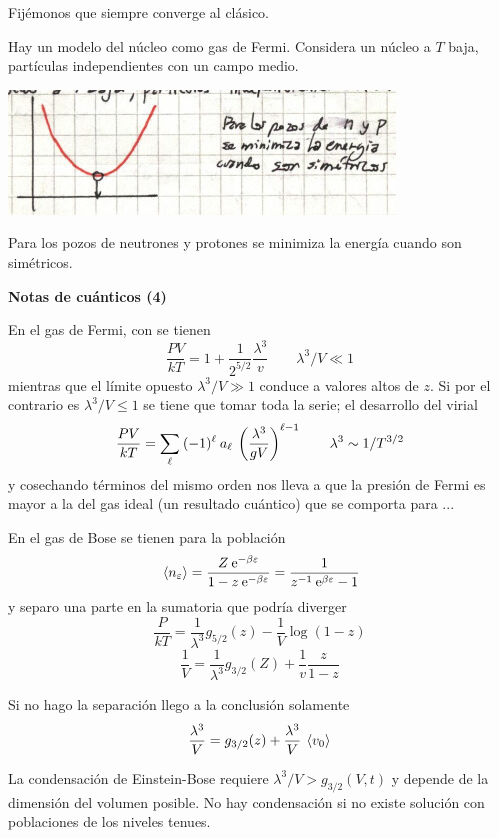 \documentclass[10pt,oneside]{CBFT_book}
\begin{document}
Fijémonos que siempre converge al clásico.

Hay un modelo del núcleo como gas de Fermi. Considera un núcleo a $T$ baja, partículas independientes
con un campo medio.

\includegraphics[scale=0.5]{images/1606329524.jpg}

Para los pozos de neutrones y protones se minimiza la energía cuando son simétricos.

\textbf{Notas de cuánticos (4)}

En el gas de Fermi, con se tienen
\[
	\frac{PV}{kT} = 1 + \frac{1}{2^{5/2}} \frac{\lambda^3}{v} \qquad  \lambda^3/V \ll 1
\]
mientras que el límite opuesto $ \lambda^3/V \gg 1$ conduce a valores altos de $z$.
Si por el contrario es $ \lambda^3/V \leq 1$ se tiene que tomar toda la serie; el desarrollo del virial
\[
	\frac{PV}{kT} = \sum_\ell \: (-1)^\ell \: a_\ell \: \left( \frac{  \lambda^3  }{  g V  } \right)^{\ell-1}
	\qquad \lambda^3 \sim 1 /T^{3/2}
\]
y cosechando términos del mismo orden nos lleva a que la presión de Fermi es mayor a la del gas ideal
(un resultado cuántico) que se comporta para ...

En el gas de Bose se tienen para la población
\[
	\:\left\langle n_\varepsilon \right\rangle = \frac{ Z \:\mathrm{e}^{-\beta \varepsilon}}{1 - z \:\mathrm{e}^{-\beta \varepsilon}} = 
	\frac{ 1 }{ z^{-1} \:\mathrm{e}^{\beta\varepsilon} - 1 }
\]
y separo una parte en la sumatoria que podría diverger
\[
	\frac{P}{kT} = \frac{1}{ \lambda^3} g_{5/2}(z) - \frac{1}{V} \log (1-z)
\]
\[
	\frac{1}{V} = \frac{1}{ \lambda^3} g_{3/2}(Z) + \frac{1}{v} \frac{z}{1-z}
\]

Si no hago la separación llego a la conclusión solamente
\[
	\frac{ \lambda^3 }{ V } = g_{3/2}(z) + \frac{ \lambda^3 }{V} \:\left\langle  v_0  \right\rangle
\]

La condensación de Einstein-Bose requiere $ \lambda^3/V > g_{3/2}(V,t)$ y depende de la dimensión
del volumen posible.
No hay condensación si no existe solución con poblaciones de los niveles tenues.
\end{document}
